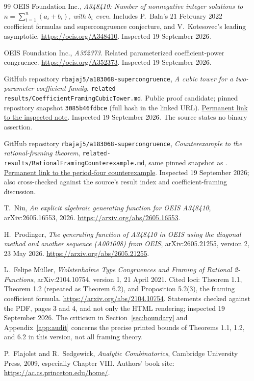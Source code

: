 \documentclass[11pt,a4paper]{article}
\numberwithin{equation}{section}
\theoremstyle{definition}
\theoremstyle{remark}
\begin{document}
\begin{thebibliography}{99}
OEIS Foundation Inc., \emph{A348410: Number of nonnegative integer solutions
to $n=\sum_{i=1}^n(a_i+b_i)$, with $b_i$ even}. Includes P.~Bala's
21 February 2022 coefficient formulas and supercongruence conjecture,
and V.~Kotesovec's leading asymptotic.
\url{https://oeis.org/A348410}. Inspected 19 September 2026.

OEIS Foundation Inc., \emph{A352373}. Related parameterized
coefficient-power congruence.
\url{https://oeis.org/A352373}. Inspected 19 September 2026.

GitHub repository \texttt{rbajaj5/a183068-supercongruence},
\emph{A cubic tower for a two-parameter coefficient family},
\texttt{related-results/CoefficientFramingCubicTower.md}.
Public proof candidate; pinned repository snapshot
\texttt{3085b46fdbce} (full hash in the linked URL).
\href{https://github.com/rbajaj5/a183068-supercongruence/blob/3085b46fdbce945d156d2b5b8b9d1a66627b4375/related-results/CoefficientFramingCubicTower.md}{Permanent link to the inspected note}.
Inspected 19 September 2026. The source states no binary assertion.

GitHub repository \texttt{rbajaj5/a183068-supercongruence},
\emph{Counterexample to the rational-framing theorem},
\texttt{related-results/RationalFramingCounterexample.md}, same pinned
snapshot as \cite{prior}.
\href{https://github.com/rbajaj5/a183068-supercongruence/blob/3085b46fdbce945d156d2b5b8b9d1a66627b4375/related-results/RationalFramingCounterexample.md}{Permanent link to the period-four counterexample}.
Inspected 19 September 2026; also cross-checked against the source's
result index and coefficient-framing discussion.

T.~Niu, \emph{An explicit algebraic generating function for OEIS A348410},
arXiv:2605.16553, 2026.
\url{https://arxiv.org/abs/2605.16553}.

H.~Prodinger, \emph{The generating function of A348410 in OEIS using the
diagonal method and another sequence (A001008) from OEIS},
arXiv:2605.21255, version 2, 23 May 2026.
\url{https://arxiv.org/abs/2605.21255}.

L.~Felipe M\"uller, \emph{Wolstenholme Type Congruences and Framing of Rational
2-Functions}, arXiv:2104.10754, version 1, 21 April 2021.
Cited loci: Theorem 1.1, Theorem 1.2 (repeated as Theorem 6.2), and
Proposition 5.2(3), the framing coefficient formula.
\url{https://arxiv.org/abs/2104.10754}.
Statements checked against the PDF, pages 3 and 4, and not only the HTML
rendering; inspected 19 September 2026.
The criticism in Section~\ref{sec:boundary} and Appendix~\ref{app:audit}
concerns the precise printed bounds of Theorems 1.1, 1.2, and 6.2 in this
version, not all framing theory.

P.~Flajolet and R.~Sedgewick, \emph{Analytic Combinatorics}, Cambridge
University Press, 2009, especially Chapter VIII.
Authors' book site: \url{https://ac.cs.princeton.edu/home/}.
\end{thebibliography}
\end{document}
